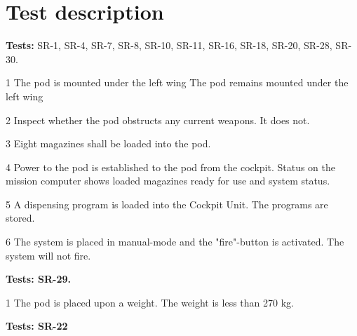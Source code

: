 \documentclass[Main]{subfiles}
\begin{document}
\chapter{Test description}

\textbf{Tests: }
SR-1, SR-4, SR-7, SR-8, SR-10, SR-11, SR-16, SR-18, SR-20, SR-28, SR-30.


\begin{TestCaseIntro}
\end{TestCaseIntro}

\begin{TestCase}
\TC
{1}
{The pod is mounted under the left wing}
{The pod remains mounted under the left wing}
{}

\TC
{2}
{Inspect whether the pod obstructs any current weapons.}
{It does not.}
{}

\TC
{3}
{Eight magazines shall be loaded into the pod.}
{}
{}

\TC
{4}
{Power to the pod is established to the pod from the cockpit.}
{Status on the mission computer shows loaded magazines ready for use and system status.}
{}

\TC
{5}
{A dispensing program is loaded into the Cockpit Unit.}
{The programs are stored.}
{}

\TC
{6}
{The system is placed in manual-mode and the "fire"-button is activated.}
{The system will not fire.}
{}

\end{TestCase}


\textbf{Tests: SR-29.}


\begin{TestCaseIntro}
\end{TestCaseIntro}

\begin{TestCase}
\TC
{1}
{The pod is placed upon a weight.}
{The weight is less than 270 kg.}
{}
\end{TestCase}



\textbf{Tests: SR-22}


\begin{TestCaseIntro}
\end{TestCaseIntro}
\end{document}
